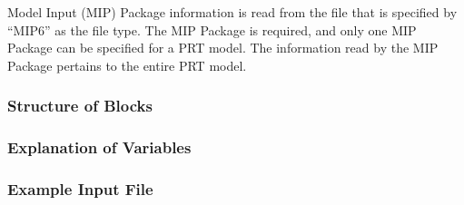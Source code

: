Model Input (MIP) Package information is read from the file that is specified by ``MIP6'' as the file type.  The MIP Package is required, and only one MIP Package can be specified for a PRT model.  The information read by the MIP Package pertains to the entire PRT model.

\vspace{5mm}
\subsubsection{Structure of Blocks}


\vspace{5mm}
\subsubsection{Explanation of Variables}
\begin{description}

\end{description}

\vspace{5mm}
\subsubsection{Example Input File}

